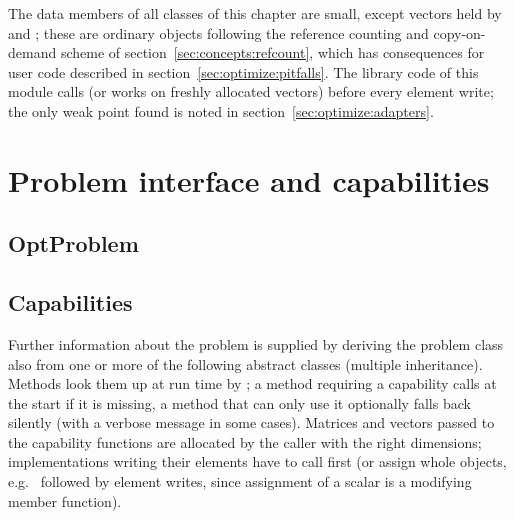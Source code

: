 The data members of all classes of this chapter are small, except vectors held by  and
; these are ordinary  objects following the reference counting and copy-on-demand scheme of
section~\ref{sec:concepts:refcount}, which has consequences for user code described in section~\ref{sec:optimize:pitfalls}.
The library code of this module calls  (or works on freshly allocated vectors) before every element write;
the only weak point found is noted in section~\ref{sec:optimize:adapters}.

\section{Problem interface and capabilities}\label{sec:optimize:problem}

\subsection{OptProblem}

\begin{lareference}
\end{lareference}

\subsection{Capabilities}\label{sec:optimize:capabilities}

Further information about the problem is supplied by deriving the problem class also from one or more of the following
abstract classes (multiple inheritance). Methods look them up at run time by ; a method
requiring a capability calls  at the start if it is missing, a method that can only use it optionally falls back
silently (with a verbose message in some cases). Matrices and vectors passed to the capability functions are allocated by the
caller with the right dimensions; implementations writing their elements have to call  first (or assign
whole objects, e.g.\  followed by element writes, since assignment of a scalar is a modifying member function).

